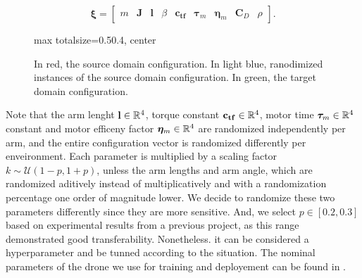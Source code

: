 




\begin{equation}
    \boldsymbol{\xi} = \begin{bmatrix} m & \mathbf{J} & \mathbf{l} & \beta &\mathbf{c_{tf}} &\boldsymbol{\tau}_m& \boldsymbol{\eta}_m & \mathbf{C}_D & \rho \end{bmatrix}.
\end{equation}
\vspace{1cm}


\begin{figure}[H]
  \centering

  \begin{adjustbox}{max totalsize={0.5\textwidth}{0.4\textheight}, center}
    
  \end{adjustbox}

  \caption{In red, the source domain configuration. In light blue, ranodimized instances of the source domain configuration. In green, the target domain configuration. }
  \label{domains}
\end{figure}
Note that the arm lenght $\mathbf{l} \in \mathbb{R}^4$, torque constant $\mathbf{c_{tf}} \in \mathbb{R}^4$, motor time $\boldsymbol{\tau}_m \in \mathbb{R}^4$ constant and motor efficeny factor $\boldsymbol{\eta}_m \in \mathbb{R}^4$ are randomized independently per arm, and the entire configuration vector is randomized differently per enveironment.
Each parameter is multiplied by a scaling factor $k \sim \mathcal{U}(1-p, 1+p)$, unless the arm lengths and arm angle,  which are randomized aditively instead of multiplicatively and with a randomization percentage one order of magnitude lower.
We decide to randomize these two parameters differently since they are more sensitive.
And, we select $p\in[0.2, 0.3]$ based on experimental results from a previous project, as this range demonstrated good transferability.
Nonetheless. it can be considered a hyperparameter and be tunned according to the situation.
The nominal parameters of the drone we use for training and deployement can be found in .




